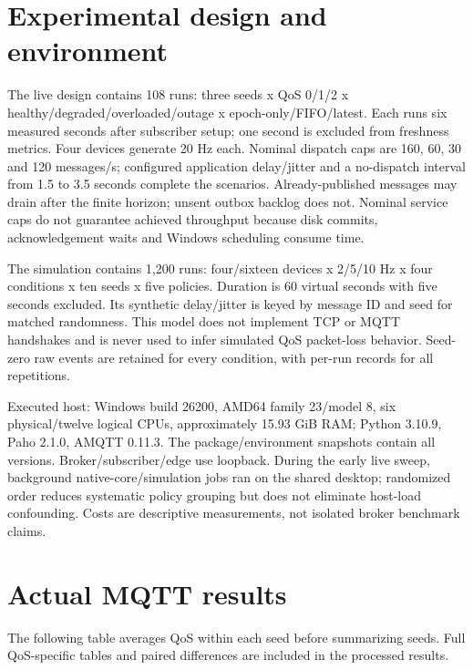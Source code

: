 \documentclass[11pt,a4paper]{article}
\begin{document}
\section{Experimental design and environment}

The live design contains 108 runs: three seeds  x  QoS 0/1/2  x  healthy/degraded/overloaded/outage  x  epoch-only/FIFO/latest. Each runs six measured seconds after subscriber setup; one second is excluded from freshness metrics. Four devices generate 20 Hz each. Nominal dispatch caps are 160, 60, 30 and 120 messages/s; configured application delay/jitter and a no-dispatch interval from 1.5 to 3.5 seconds complete the scenarios. Already-published messages may drain after the finite horizon; unsent outbox backlog does not. Nominal service caps do not guarantee achieved throughput because disk commits, acknowledgement waits and Windows scheduling consume time.


The simulation contains 1,200 runs: four/sixteen devices  x  2/5/10 Hz  x  four conditions  x  ten seeds  x  five policies. Duration is 60 virtual seconds with five seconds excluded. Its synthetic delay/jitter is keyed by message ID and seed for matched randomness. This model does not implement TCP or MQTT handshakes and is never used to infer simulated QoS packet-loss behavior. Seed-zero raw events are retained for every condition, with per-run records for all repetitions.


Executed host: Windows build 26200, AMD64 family 23/model 8, six physical/twelve logical CPUs, approximately 15.93 GiB RAM; Python 3.10.9, Paho 2.1.0, AMQTT 0.11.3. The package/environment snapshots contain all versions. Broker/subscriber/edge use loopback. During the early live sweep, background native-core/simulation jobs ran on the shared desktop; randomized order reduces systematic policy grouping but does not eliminate host-load confounding. Costs are descriptive measurements, not isolated broker benchmark claims.


\section{Actual MQTT results}

The following table averages QoS within each seed before summarizing seeds. Full QoS-specific tables and paired differences are included in the processed results.
\end{document}

